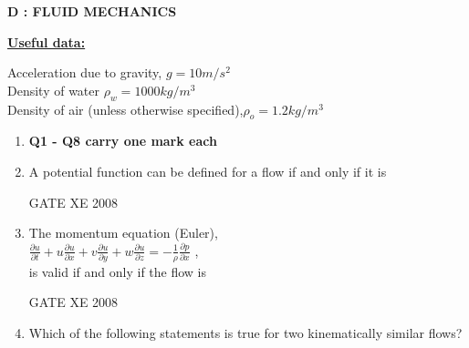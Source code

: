 \documentclass[12pt]{article}
\begin{document}
\newpage
\begin{center}
    \textbf{D : FLUID MECHANICS}
\end{center}

 \textbf{\underline{Useful data:}}
 \begin{center}
     Acceleration due to gravity, $g =10 m/s^{2}$\\
Density of water $\rho _{w} = 1000 kg/m^{3}$\\
Density of air (unless otherwise specified),$ \rho _{o}=1.2kg/m^{3}$
 \end{center}

\begin{enumerate}[label=Q\arabic*.]
\item[] \textbf{Q1 - Q8 carry one mark each}

\item A potential function can be defined for a flow if and only if it is

\begin{enumerate}[label=(\Alph*)]
\end{enumerate}


GATE XE 2008
\item The momentum equation (Euler),\\
$\frac{\partial u}{\partial t}+ u \frac{\partial u}{\partial x}+v\frac{\partial u}{\partial y}+w\frac{\partial u}{\partial z} = -\frac{1}{\rho} \frac{\partial p}{\partial x}$ ,\\
is valid if and only if the flow is

\begin{enumerate}[label=(\Alph*)]
\end{enumerate}

GATE XE 2008
\item Which of the following statements is true for two kinematically similar flows?


\end{enumerate}
\end{document}
